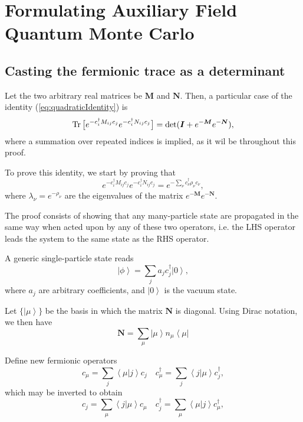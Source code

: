 \chapter{Formulating Auxiliary Field Quantum Monte Carlo}
\label{ap:theoAFQMC}


\section{Casting the fermionic trace as a determinant}\label{sec:trace_det}

Let the two arbitrary real matrices be $\bm M$ and $\bm N$.
Then, a particular case of the identity (\ref{eq:quadraticIdentity}) is
\begin{equation}\label{eq:particularIdentity}
\operatorname{Tr} \big[ e^{-c_i^\dagger M_{ij} c_j} e^{-c_i^\dagger N_{ij} c_j} \big] = \text{det} ( \bm I + e^{-{\bm M}} e^{-{\bm N}} ) ,
\end{equation}
where a summation over repeated indices is implied, as it wil be throughout this proof.

To prove this identity, we start by proving that
\begin{equation}\label{eq:identity_prod_exps}
e^{-c_i^\dagger M_{ij} c_j}  e^{-c_i^\dagger N_{ij} c_j} = e^{-\sum_\nu c_\nu^\dagger \rho_\nu c_\nu} ,
\end{equation}
where $\lambda_\nu = e^{-\rho_\nu}$ are the eigenvalues of the matrix $e^{-{\bm M}} e^{-{\bm N}}$.

The proof consists of showing that any many-particle state are propagated in the same way when acted upon by any of these two operators, i.e. the LHS operator leads the system to the same state as the RHS operator.

A generic single-particle state reads
\begin{equation}
\left| \phi \right\rangle = \sum_j a_j c_j^\dagger \left| 0 \right\rangle ,
\end{equation}
where $a_j$ are arbitrary coefficients, and $\left| 0 \right\rangle$ is the vacuum state.

Let $\{\left| \mu \right\rangle \}$ be the basis in which the matrix $\bm N$ is diagonal. Using Dirac notation, we then have
\begin{equation}
\bm N = \sum_{\mu} \left| \mu \right\rangle n_\mu \left\langle \mu \right|
\end{equation}

Define new fermionic operators
\begin{equation}\label{eq:changeBasis1}
c_\mu = \sum_j \left\langle \mu | j \right\rangle c_j \quad
c_\mu^\dagger = \sum_j \left\langle j | \mu \right\rangle c_j^\dagger ,
\end{equation}
which may be inverted to obtain
\begin{equation}\label{eq:changeBasis2}
c_j = \sum_\mu \left\langle j | \mu \right\rangle c_\mu \quad
c_j^\dagger = \sum_\mu \left\langle \mu | j \right\rangle c_\mu^\dagger ,
\end{equation}

